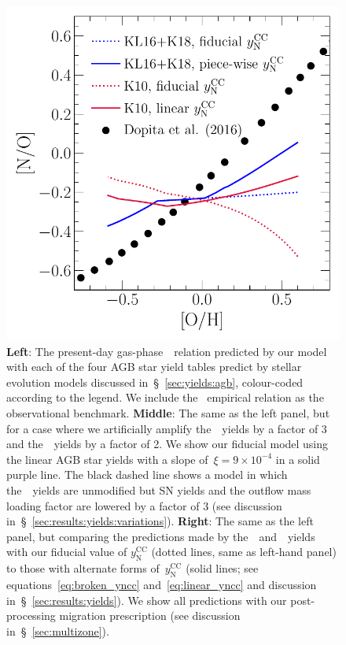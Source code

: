 \documentclass[ms.tex]{subfiles}
\begin{document}
\begin{figure}
\includegraphics[scale = 0.45]{no_oh_predictions_karakas.pdf}
\caption{
\textbf{Left}: The present-day gas-phase~\ohno~relation predicted by our
model with each of the four AGB star yield tables predict by stellar evolution
models discussed in~\S~\ref{sec:yields:agb}, colour-coded according to the
legend.
We include the~\citet{Dopita2016} empirical relation as the observational
benchmark.
\textbf{Middle}: The same as the left panel, but for a case where we
artificially amplify the~\cristallo~yields by a factor of 3 and
the~\ventura~yields by a factor of 2.
We show our fiducial model using the linear AGB star yields with a slope
of~$\xi = 9\times10^{-4}$ in a solid purple line.
The black dashed line shows a model in which the~\cristallo~yields are
unmodified but SN yields and the outflow mass loading factor are lowered by a
factor of 3 (see discussion in~\S~\ref{sec:results:yields:variations}).
\textbf{Right}: The same as the left panel, but comparing the predictions made
by the~\karakasten~and~\karakas~yields with our fiducial value of
$y_\text{N}^\text{CC}$ (dotted lines, same as left-hand panel) to those with
alternate forms of~$y_\text{N}^\text{CC}$ (solid lines; see
equations~\ref{eq:broken_yncc} and~\ref{eq:linear_yncc} and discussion
in~\S~\ref{sec:results:yields}).
We show all predictions with our post-processing migration prescription (see
discussion in~\S~\ref{sec:multizone}).
}
\label{fig:no_oh_predictions}
\end{figure}
\end{document}
